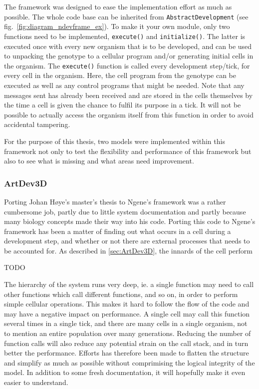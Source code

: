 The framework was designed to ease the implementation effort as much as possible. The whole code base can be inherited from \texttt{AbstractDevelopment} (see fig.~\ref{fig:diagram_ndevframe_ex}). To make it your own module, only two functions need to be implemented, \texttt{execute()} and \texttt{initialize()}. The latter is executed once with every new organism that is to be developed, and can be used to unpacking the genotype to a cellular program and/or generating initial cells in the organism. The \texttt{execute()} function is called every development step/tick, for every cell in the organism. Here, the cell program from the genotype can be executed as well as any control programs that might be needed. Note that any messages sent has already been received and are stored in the cells themselves by the time a cell is given the chance to fulfil its purpose in a tick. It will not be possible to actually access the organism itself from this function in order to avoid accidental tampering.

For the purpose of this thesis, two models were implemented within this framework not only to test the flexibility and performance of this framework but also to see what is missing and what areas need improvement.

\subsubsection{ArtDev3D}
Porting Johan H{\o}ye's master's thesis\cite{hoye2006} to Ngene's framework was a rather cumbersome job, partly due to little system documentation and partly because many biology concepts made their way into his code. Porting this code to Ngene's framework has been a matter of finding out what occurs in a cell during a development step, and whether or not there are external processes that needs to be accounted for. As described in \ref{sec:ArtDev3D}, the innards of the cell perform


TODO


The hierarchy of the system runs very deep, ie. a single function may need to call other functions which call different functions, and so on, in order to perform simple cellular operations. This makes it hard to follow the flow of the code and may have a negative impact on performance. A single cell may call this function several times in a single tick, and there are many cells in a single organism, not to mention an entire population over many generations. Reducing the number of function calls will also reduce any potential strain on the call stack, and in turn better the performance. Efforts has therefore been made to flatten the structure and simplify as much as possible without comprimising the logical integrity of the model. In addition to some fresh documentation, it will hopefully make it even easier to understand.

